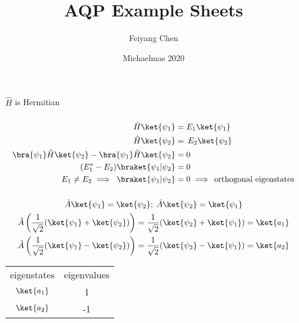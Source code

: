 \documentclass[12pt]{article}
\begin{document}
\title{AQP Example Sheets}
\author{Feiyang Chen}
\date{Michaelmas 2020}
\maketitle
\thispagestyle{empty}
\tableofcontents
\newpage
\section{}
\subsection{} \( \hat{H}\) is Hermitian
\subsubsection{} \begin{align*}
    \hat{H} \ket{\psi_1} &=  E_1 \ket{\psi_1}\\
    \hat{H} \ket{\psi_2} &=\, E_2 \ket{\psi_2}\\
    \bra{\psi_1} \hat{H} \ket{\psi_2} - \bra{\psi_1} \hat{H}
    \ket{\psi_2} &= 0\\
    (E_1^* - E_2)\braket{\psi_1|\psi_2} &=  0\\
    E_1\neq E_2 \implies\; \braket{\psi_1|\psi_2} &=  0    \implies\, \text{orthogonal eigenstates}  
\end{align*}
\subsubsection{} \begin{gather*}
    \hat{A} \ket{\psi_1} =\ket{\psi_2};\;  \hat{A}
    \ket{\psi_2} =\ket{\psi_1}\\
    \hat{A}\left(\frac{1}{\sqrt{2}}(\ket{\psi_1} + \ket{\psi_2})\right) = \frac{1}{\sqrt{2}} (\ket{\psi_2} + \ket{\psi_1}) = \ket{a_1}\\
    \hat{A}\left(\frac{1}{\sqrt{2}}(\ket{\psi_1} - \ket{\psi_2})\right) = \frac{1}{\sqrt{2}} (\ket{\psi_2} - \ket{\psi_1}) = \ket{a_2} 
\end{gather*}
\begin{center} \begin{tabular}{cc} 
    eigenstates & eigenvalues  \\ 
    \( \ket{a_1} \) &  1\\ 
    \( \ket{a_2} \) & -1\\
\end{tabular} \end{center}
\end{document}
